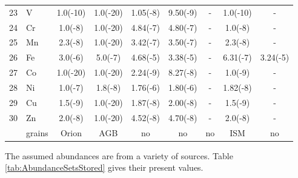 \begin{table}
\begin{tabular}{llccccccc}
23& V& 1.0(-10)& 1.0(-20)& 1.05(-8)& 9.50(-9)& -& 1.0(-10)& -\\
24& Cr& 1.0(-8)& 1.0(-20)& 4.84(-7)& 4.80(-7)& -& 1.0(-8)& -\\
25& Mn& 2.3(-8)& 1.0(-20)& 3.42(-7)& 3.50(-7)& -& 2.3(-8)& -\\
\hline
26& Fe& 3.0(-6)& 5.0(-7)& 4.68(-5)& 3.38(-5)& -& 6.31(-7)& 3.24(-5)\\
27& Co& 1.0(-20)& 1.0(-20)& 2.24(-9)& 8.27(-8)& -& 1.0(-9)& -\\
28& Ni& 1.0(-7)& 1.8(-8)& 1.76(-6)& 1.80(-6)& -& 1.82(-8)& -\\
29& Cu& 1.5(-9)& 1.0(-20)& 1.87(-8)& 2.00(-8)& -& 1.5(-9)& -\\
30& Zn& 2.0(-8)& 1.0(-20)& 4.52(-8)& 4.70(-8)& -& 2.0(-8)& -\\
\hline
&grains& Orion& AGB& no& no& no& ISM& no\\
\hline
\end{tabular}
\end{table}

The assumed abundances are from a variety of sources.
Table \ref{tab:AbundanceSetsStored} gives
their present values.

